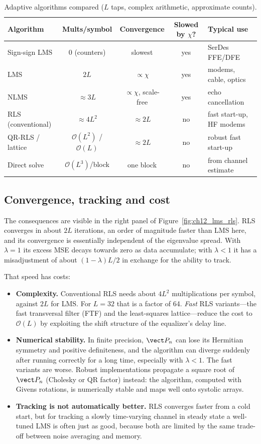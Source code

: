 \begin{table}[htbp]\centering\small
\caption{Adaptive algorithms compared ($L$ taps, complex arithmetic, approximate counts).}
\label{tab:ch12:adaptive}
\begin{tabular}{lcccl}
\toprule
Algorithm & Mults/symbol & Convergence & Slowed by $\chi$? & Typical use \\
\midrule
Sign-sign LMS & 0 (counters) & slowest & yes & SerDes FFE/DFE \\
LMS & $2L$ & $\propto\chi$ & yes & modems, cable, optics \\
NLMS & $\approx3L$ & $\propto\chi$, scale-free & yes & echo cancellation \\
RLS (conventional) & $\approx4L^2$ & $\approx2L$ & no & fast start-up, HF modems \\
QR-RLS / lattice & $\mathcal O(L^2)$ / $\mathcal O(L)$ & $\approx2L$ & no & robust fast start-up \\
Direct solve & $\mathcal O(L^3)$/block & one block & no & from channel estimate \\
\bottomrule
\end{tabular}
\end{table}

\subsection{Convergence, tracking and cost}

The consequences are visible in the right panel of Figure~\ref{fig:ch12_lms_rls}. RLS converges in
about $2L$ iterations, an order of magnitude faster than LMS here, and its convergence is essentially
independent of the eigenvalue spread. With $\lambda=1$ its excess MSE decays towards zero as data
accumulate; with $\lambda<1$ it has a misadjustment of about $(1-\lambda)L/2$ in exchange for the
ability to track.

That speed has costs:
\begin{itemize}
\item \textbf{Complexity.} Conventional RLS needs about $4L^2$ multiplications per symbol, against
$2L$ for LMS. For $L=32$ that is a factor of 64. \emph{Fast} RLS variants---the fast transversal
filter (FTF) and the least-squares lattice---reduce the cost to $\mathcal O(L)$ by exploiting the
shift structure of the equalizer's delay line.
\item \textbf{Numerical stability.} In finite precision, $\vect P_n$ can lose its Hermitian
symmetry and positive definiteness, and the algorithm can diverge suddenly after running
correctly for a long time, especially with $\lambda<1$. The fast variants are worse. Robust
implementations propagate a square root of $\vect P_n$ (Cholesky or QR factor) instead: the
 algorithm, computed with Givens rotations, is numerically stable and maps well onto
systolic arrays.
\item \textbf{Tracking is not automatically better.} RLS converges faster from a cold start, but
for tracking a slowly time-varying channel in steady state a well-tuned LMS is often just as good,
because both are limited by the same trade-off between noise averaging and memory.
\end{itemize}

